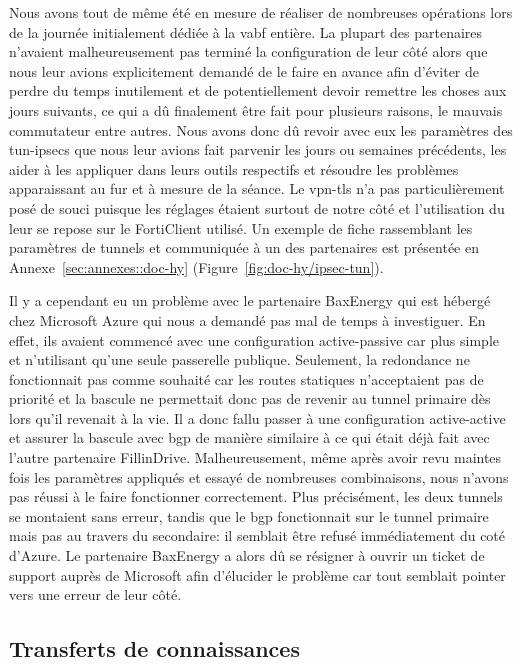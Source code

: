 \documentclass[12pt, oneside, a4paper, titlepage]{report}
\begin{document}
Nous avons tout de même été en mesure de réaliser de nombreuses opérations lors
de la journée initialement dédiée à la \gls{vabf} entière. La plupart des
partenaires n'avaient malheureusement pas terminé la configuration de leur côté
alors que nous leur avions explicitement demandé de le faire en avance afin
d'éviter de perdre du temps inutilement et de potentiellement devoir remettre
les choses aux jours suivants, ce qui a dû finalement être fait pour plusieurs
raisons, le mauvais commutateur entre autres. Nous avons donc dû revoir avec eux
les paramètres des \glspl{tun-ipsec} que nous leur avions fait parvenir les
jours ou semaines précédents, les aider à les appliquer dans leurs outils
respectifs et résoudre les problèmes apparaissant au fur et à mesure de la
séance. Le \gls{vpn-tls} n'a pas particulièrement posé de souci puisque les
réglages étaient surtout de notre côté et l'utilisation du leur se repose sur le
FortiClient utilisé. Un exemple de fiche rassemblant les paramètres de tunnels
et communiquée à un des partenaires est présentée en
Annexe~\ref{sec:annexes::doc-hy} (Figure~\ref{fig:doc-hy/ipsec-tun}).

Il y a cependant eu un problème avec le partenaire BaxEnergy qui est hébergé
chez Microsoft Azure qui nous a demandé pas mal de temps à investiguer. En
effet, ils avaient commencé avec une configuration active-passive car plus
simple et n'utilisant qu'une seule passerelle publique.  Seulement, la
redondance ne fonctionnait pas comme souhaité car les routes statiques
n'acceptaient pas de priorité et la bascule ne permettait donc pas de revenir au
tunnel primaire dès lors qu'il revenait à la vie. Il a donc fallu passer à une
configuration active-active et assurer la bascule avec \gls{bgp} de manière
similaire à ce qui était déjà fait avec l'autre partenaire FillinDrive.
Malheureusement, même après avoir revu maintes fois les paramètres appliqués et
essayé de nombreuses combinaisons, nous n'avons pas réussi à le faire
fonctionner correctement. Plus précisément, les deux tunnels se montaient sans
erreur, tandis que le \gls{bgp} fonctionnait sur le tunnel primaire mais pas au
travers du secondaire: il semblait être refusé immédiatement du coté d'Azure. Le
partenaire BaxEnergy a alors dû se résigner à ouvrir un ticket de support auprès
de Microsoft afin d'élucider le problème car tout semblait pointer vers une
erreur de leur côté.

\FloatBarrier{}
\subsection{Transferts de connaissances}%
\label{sub:mission::main::trans}
\end{document}

